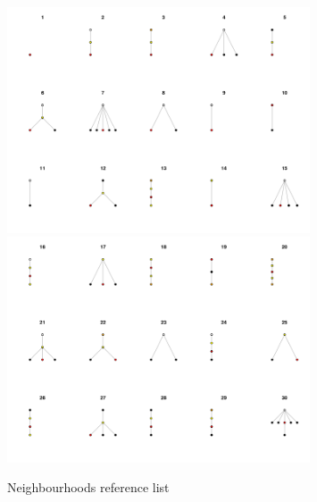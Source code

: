 \documentclass[conference]{IEEEtran}
\begin{document}
\begin{figure}
	\centering
	\includegraphics[width=0.8\textwidth]{dictionary1}
	\includegraphics[width=0.8\textwidth]{dictionary2}
	\caption{Neighbourhoods reference list}
	\label{fig:dictionary}
\end{figure}








\end{document}
